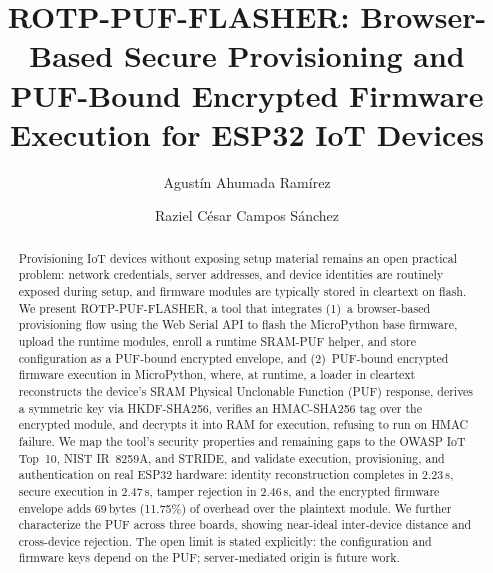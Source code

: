 \documentclass[runningheads]{llncs}
\begin{document}
\title{ROTP-PUF-FLASHER: Browser-Based Secure Provisioning and PUF-Bound Encrypted Firmware Execution for ESP32 IoT Devices}


\author{Agust\'in Ahumada Ram\'irez \and
        Raziel C\'esar Campos S\'anchez}



\maketitle


\begin{abstract}

Provisioning IoT devices without exposing setup material remains an open practical problem: network credentials, server addresses, and device identities are routinely exposed during setup, and firmware modules are typically stored in cleartext on flash. We present ROTP-PUF-FLASHER, a tool that integrates (1)~a browser-based provisioning flow using the Web Serial API to flash the MicroPython base firmware, upload the runtime modules, enroll a runtime SRAM-PUF helper, and store configuration as a PUF-bound encrypted envelope, and (2)~PUF-bound encrypted firmware execution in MicroPython, where, at runtime, a loader in cleartext reconstructs the device's SRAM Physical Unclonable Function (PUF) response, derives a symmetric key via HKDF-SHA256, verifies an HMAC-SHA256 tag over the encrypted module, and decrypts it into RAM for execution, refusing to run on HMAC failure. We map the tool's security properties and remaining gaps to the OWASP IoT Top~10, NIST IR~8259A, and STRIDE, and validate execution, provisioning, and authentication on real ESP32 hardware: identity reconstruction completes in 2.23\,s, secure execution in 2.47\,s, tamper rejection in 2.46\,s, and the encrypted firmware envelope adds 69\,bytes (11.75\%) of overhead over the plaintext module. We further characterize the PUF across three boards, showing near-ideal inter-device distance and cross-device rejection. The open limit is stated explicitly: the configuration and firmware keys depend on the PUF; server-mediated origin is future work.

\end{abstract}
\end{document}
